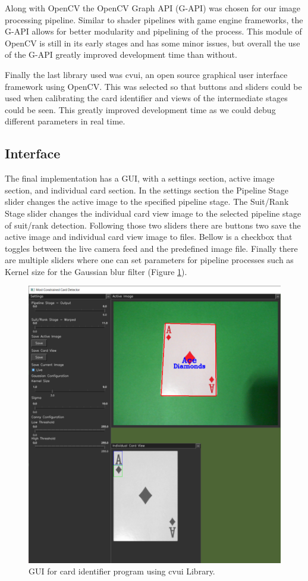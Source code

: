 \documentclass[conference]{IEEEtran}
\begin{document}
Along with OpenCV the OpenCV Graph API (G-API) was chosen for our image processing pipeline. Similar
to shader pipelines with game engine frameworks, the G-API allows for better modularity and
pipelining of the process. This module of OpenCV is still in its early stages and has some minor
issues, but overall the use of the G-API greatly improved development time than without.

Finally the last library used was cvui, an open source graphical user interface framework using
OpenCV. This was selected so that buttons and sliders could be used when calibrating the card
identifier and views of the intermediate stages could be seen. This greatly improved development
time as we could debug different parameters in real time.

\subsection{Interface}
The final implementation has a GUI, with a settings section, active image section, and individual
card section. In the settings section the Pipeline Stage slider changes the active image to the
specified pipeline stage. The Suit/Rank Stage slider changes the individual card view image to the
selected pipeline stage of suit/rank detection. Following those two sliders there are buttons two
save the active image and individual card view image to files. Bellow is a checkbox that toggles
between the live camera feed and the predefined image file. Finally there are multiple sliders where
one can set parameters for pipeline processes such as Kernel size for the Gaussian blur filter
(Figure \ref{fig:gui}).

\begin{figure}[htbp]
\centerline{\includegraphics[width=\columnwidth]{gui.png}}
\caption{GUI for card identifier program using cvui Library.}
\label{fig:gui}
\end{figure}
\end{document}
